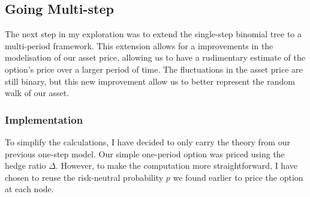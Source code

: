 \documentclass{article}
\begin{document}
    \subsection{Going Multi-step}

    The next step in my exploration was to extend the single-step binomial tree to a multi-period framework.
    This extension allows for a improvements in the modelisation of our asset price, allowing us to have a rudimentary estimate of the option's price over a larger period of time.
    The fluctuations in the asset price are still binary, but this new improvement allow us to better represent the random walk of our asset.

    \subsubsection{Implementation}

    To simplify the calculations, I have decided to only carry the theory from our previous one-step model.
    Our simple one-period option was priced using the hedge ratio \(\Delta\).
    However, to make the computation more straightforward, I have chosen to reuse the risk-neutral probability \(p\) we found earlier to price the option at each node.
\end{document}
